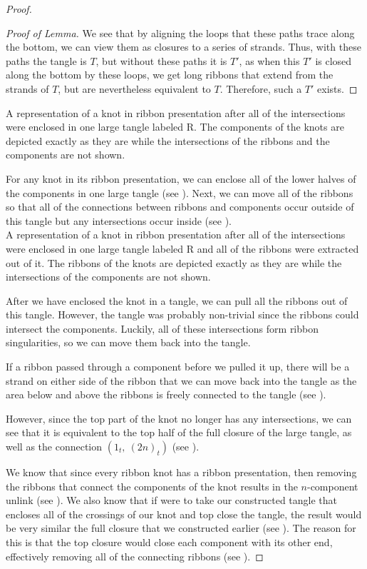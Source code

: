 \begin{paper}
\begin{proof}
\begin{proof}[Proof of Lemma]
We see that by aligning the loops that these paths trace along the bottom,
we can view them as closures to a series of strands.
Thus, with these paths the tangle is $T$, but without these paths it is $T'$,
as when this $T'$ is closed along the bottom by these loops, we get long ribbons
that extend from the strands of $T$, but are nevertheless equivalent to $T$.
Therefore, such a $T'$ exists.
\end{proof}

{A representation of a knot in ribbon presentation after all of the
intersections were enclosed in one large tangle labeled R.
The components of the knots are depicted exactly as they are while the
intersections of the ribbons and the components are not shown.}

For any knot in its ribbon presentation, we can enclose all of the lower halves
of the components in one large tangle (see \figPresentation).
Next, we can move all of the ribbons so that all of the connections between
ribbons and components occur outside of this tangle but any intersections occur
inside (see \figLowered).\\

{A representation of a knot in ribbon presentation after all of the
intersections were enclosed in one large tangle labeled R and all of the ribbons
were extracted out of it.
The ribbons of the knots are depicted exactly as they are while the
intersections of the components are not shown.}

After we have enclosed the knot in a tangle, we can pull all the ribbons out of
this tangle.
However, the tangle was probably non-trivial since the ribbons could intersect
the components.
Luckily, all of these intersections form ribbon singularities, so we can move
them back into the tangle.

If a ribbon passed through a component before we pulled it up, there will be a
strand on either side of the ribbon that we can move back into the tangle as the
area below and above the ribbons is freely connected to the tangle (see
\figTwisted).

However, since the top part of the knot no longer has any intersections, we can
see that it is equivalent to the top half of the full closure of the large
tangle, as well as the connection $(1_t,~(2n)_t)$ (see \figFull).

We know that since every ribbon knot has a ribbon presentation, then removing
the ribbons that connect the components of the knot results in the $n$-component
unlink (see \figPresentation).
We also know that if were to take our constructed tangle that encloses all of
the crossings of our knot and top close the tangle, the result would be very
similar the full closure that we constructed earlier (see \figTop).
The reason for this is that the top closure would close each component with its
other end, effectively removing all of the connecting ribbons (see \figTwisted).


\end{proof}
\end{paper}
